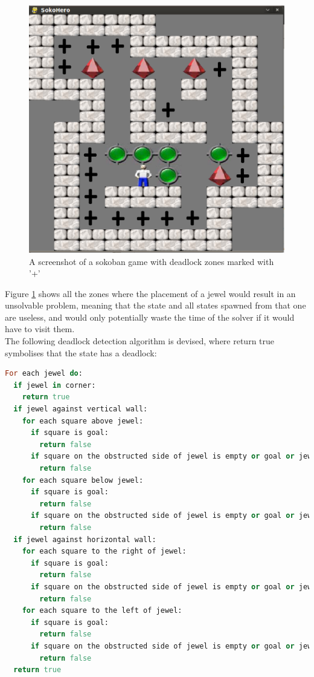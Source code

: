 \begin{figure}[ht]
\centering
\includegraphics[scale=0.25]{images/sokohero_deadlocks.eps}
\caption{A screenshot of a sokoban game with deadlock zones marked with '+'}
\label{fig:sokoherodeadlocks}
\end{figure}

Figure \ref{fig:sokoherodeadlocks} shows all the zones where the placement of a jewel would result in an unsolvable problem, meaning that the state and all states spawned from that one are useless, and would only potentially waste the time of the solver if it would have to visit them.
\\
The following deadlock detection algorithm is devised, where return true symbolises that the state has a deadlock:

\begin{lstlisting}[language=Ruby, frame=single, basicstyle=\scriptsize, caption={Deadlock detection pseudo code}, label={code:deaddetect}]
For each jewel do:
  if jewel in corner:
    return true
  if jewel against vertical wall:
    for each square above jewel:
      if square is goal:
        return false
      if square on the obstructed side of jewel is empty or goal or jewel:
        return false
    for each square below jewel:
      if square is goal:
        return false
      if square on the obstructed side of jewel is empty or goal or jewel:
        return false
  if jewel against horizontal wall:
    for each square to the right of jewel:
      if square is goal:
        return false
      if square on the obstructed side of jewel is empty or goal or jewel:
        return false
    for each square to the left of jewel:
      if square is goal:
        return false
      if square on the obstructed side of jewel is empty or goal or jewel:
        return false
  return true
\end{lstlisting}

